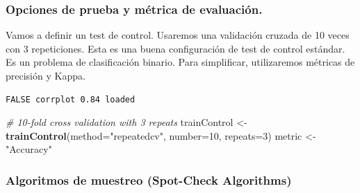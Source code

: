 \documentclass[]{article}
\newenvironment{Shaded}{\begin{snugshade}}{\end{snugshade}}
\newcommand{\KeywordTok}[1]{\textcolor[rgb]{0.13,0.29,0.53}{\textbf{#1}}}
\newcommand{\DataTypeTok}[1]{\textcolor[rgb]{0.13,0.29,0.53}{#1}}
\newcommand{\DecValTok}[1]{\textcolor[rgb]{0.00,0.00,0.81}{#1}}
\newcommand{\StringTok}[1]{\textcolor[rgb]{0.31,0.60,0.02}{#1}}
\newcommand{\CommentTok}[1]{\textcolor[rgb]{0.56,0.35,0.01}{\textit{#1}}}
\newcommand{\NormalTok}[1]{#1}
\begin{document}
\subsubsection{Opciones de prueba y métrica de
evaluación.}\label{opciones-de-prueba-y-metrica-de-evaluacion.}

Vamos a definir un test de control. Usaremos una validación cruzada de
10 veces con 3 repeticiones. Esta es una buena configuración de test de
control estándar. Es un problema de clasificación binario. Para
simplificar, utilizaremos métricas de precisión y Kappa.

\begin{verbatim}
FALSE corrplot 0.84 loaded
\end{verbatim}

\begin{Shaded}
\begin{Highlighting}[]
\CommentTok{# 10-fold cross validation with 3 repeats}
\NormalTok{trainControl <-}\StringTok{ }\KeywordTok{trainControl}\NormalTok{(}\DataTypeTok{method=}\StringTok{"repeatedcv"}\NormalTok{, }\DataTypeTok{number=}\DecValTok{10}\NormalTok{, }\DataTypeTok{repeats=}\DecValTok{3}\NormalTok{)}
\NormalTok{metric <-}\StringTok{ "Accuracy"}
\end{Highlighting}
\end{Shaded}

\subsubsection{Algoritmos de muestreo (Spot-Check
Algorithms)}\label{algoritmos-de-muestreo-spot-check-algorithms}
\end{document}
